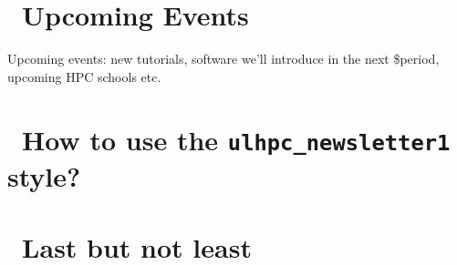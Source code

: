\documentclass[a4paper]{article}
\begin{document}
\section{\faCalendar\ Upcoming Events}
Upcoming events: new tutorials, software we'll introduce in the next
\$period, upcoming HPC schools etc.

\newpage
\section{\faCogs\ How to use the \texttt{ulhpc\_newsletter1} style?}





      


% 




% 




\section{\faBeer\ Last but not least}

\lipsum[2-8]
\end{document}

